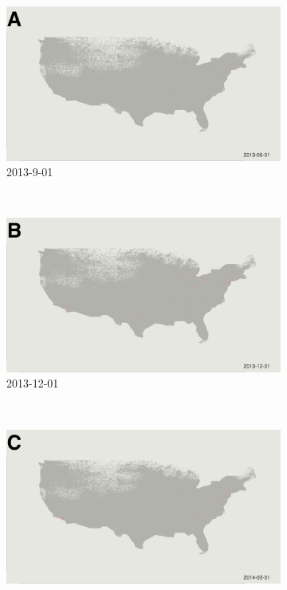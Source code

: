 \begin{figure}
    \centering
    \begin{subfigure}[b]{0.6\textwidth}
        \includegraphics[width=\textwidth]{longitude/figs/visual/usa0.png}
        \caption*{2013-9-01}
    \end{subfigure}
    ~ %
    \begin{subfigure}[b]{0.6\textwidth}
        \includegraphics[width=\textwidth]{longitude/figs/visual/usa1.png}
        \caption*{2013-12-01}
    \end{subfigure}
    ~ %
    \begin{subfigure}[b]{0.6\textwidth}
        \includegraphics[width=\textwidth]{longitude/figs/visual/usa2.png}

\end{subfigure}
\end{figure}
